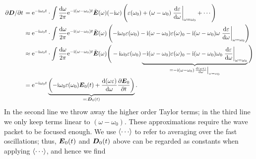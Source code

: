 \documentclass[hyperref, a4paper]{article}
\newcommand*{\ii}{\mathrm{i}}
\newcommand*{\ee}{\mathrm{e}}
\newcommand{\Efreq}{\tilde{\vb*{E}}}
\begin{document}
\begin{equation}
    \begin{aligned}
        \pdv*{\vb*{D}}{t} &= 
        \ee^{- \ii \omega_0 t} \cdot 
        \int \frac{\dd{\omega}}{2\pi} \ee^{- \ii (\omega - \omega_0) t} \Efreq(\omega) 
        (-\ii \omega) \left(
            \varepsilon(\omega_0) + 
            (\omega - \omega_0) \eval{\dv{\varepsilon}{\omega}}_{\omega = \omega_0}
            + \cdots 
        \right) \\
        &\approx \ee^{- \ii \omega_0 t} \cdot 
        \int \frac{\dd{\omega}}{2\pi} \ee^{- \ii (\omega - \omega_0) t} \Efreq(\omega) 
        \left(
            - \ii \omega_0 \varepsilon(\omega_0) 
            - \ii (\omega - \omega_0) \varepsilon(\omega)_0 
            - \ii (\omega - \omega_0) \omega 
                \eval{\dv{\varepsilon}{\omega}}_{\omega = \omega_0}
        \right) \\
        &\approx \ee^{- \ii \omega_0 t} \cdot 
        \int \frac{\dd{\omega}}{2\pi} \ee^{- \ii (\omega - \omega_0) t} \Efreq(\omega) 
        \Bigg(
            - \ii \omega_0 \varepsilon(\omega_0) 
            \underbrace{
                - \ii (\omega - \omega_0) \varepsilon(\omega)_0 
                - \ii (\omega - \omega_0) \omega_0  
                    \eval{\dv{\varepsilon}{\omega}}_{\omega = \omega_0}
            }_{
                = - \ii (\omega - \omega_0) 
                \eval{\dv{(\omega \varepsilon)}{\omega}}_{\omega = \omega_0} 
            }
        \Bigg) \\
        &= \ee^{- \ii \omega_0 t} \underbrace{
            \left(
                - \ii \omega_0 \varepsilon(\omega_0) \vb*{E}_0(t)
                + \dv{(\omega \varepsilon)}{\omega} 
                \pdv{\vb*{E}_0}{t}  
            \right)
        }_{\eqqcolon \vb*{D}_0(t)} .
    \end{aligned}
    \label{eq:pdv-d-t-derivation}
\end{equation}
In the second line we throw away the higher order Taylor terms;
in the third line we only keep terms linear to $(\omega - \omega_0)$.
These approximations require the wave packet 
to be focused enough.
We use $\expval{\cdots}$ to refer to 
averaging over the fast oscillations;
thus, $\vb*{E}_0(t)$ and $\vb*{D}_0(t)$ above 
can be regarded as constants when applying $\expval{\cdots}$,
and hence we find 
\end{document}
